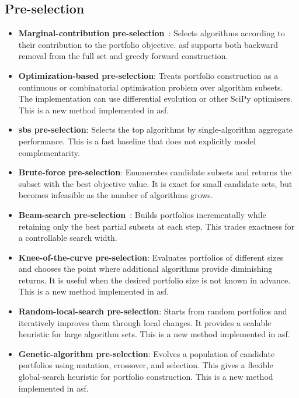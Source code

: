 \subsection{Pre-selection}
\begin{itemize}
    \item \textbf{Marginal-contribution pre-selection}~\citep{XuEtAl08}: Selects algorithms according to their contribution to the portfolio objective. \Gls{asf} supports both backward removal from the full set and greedy forward construction.
    \item \textbf{Optimization-based pre-selection}: Treats portfolio construction as a continuous or combinatorial optimisation problem over algorithm subsets. The implementation can use differential evolution or other SciPy optimisers. This is a new method implemented in \gls{asf}.
    \item \textbf{\gls{sbs} pre-selection}: Selects the top algorithms by single-algorithm aggregate performance. This is a fast baseline that does not explicitly model complementarity.
    \item \textbf{Brute-force pre-selection}: Enumerates candidate subsets and returns the subset with the best objective value. It is exact for small candidate sets, but becomes infeasible as the number of algorithms grows.
    \item \textbf{Beam-search pre-selection}~\citep{BacEtAl22}: Builds portfolios incrementally while retaining only the best partial subsets at each step. This trades exactness for a controllable search width.
    \item \textbf{Knee-of-the-curve pre-selection}: Evaluates portfolios of different sizes and chooses the point where additional algorithms provide diminishing returns. It is useful when the desired portfolio size is not known in advance. This is a new method implemented in \gls{asf}.
    \item \textbf{Random-local-search pre-selection}: Starts from random portfolios and iteratively improves them through local changes. It provides a scalable heuristic for large algorithm sets. This is a new method implemented in \gls{asf}.
    \item \textbf{Genetic-algorithm pre-selection}: Evolves a population of candidate portfolios using mutation, crossover, and selection. This gives a flexible global-search heuristic for portfolio construction. This is a new method implemented in \gls{asf}.
\end{itemize}

